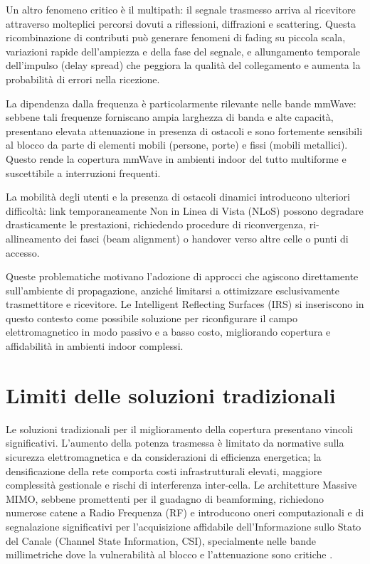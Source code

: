 \documentclass[12pt,a4paper]{report}
\begin{document}
Un altro fenomeno critico è il multipath: il segnale trasmesso arriva
al ricevitore attraverso molteplici percorsi dovuti a riflessioni,
diffrazioni e scattering. Questa ricombinazione di contributi può generare fenomeni di fading su piccola scala, variazioni rapide dell'ampiezza e della fase del segnale, e allungamento temporale dell'impulso (delay spread) che peggiora la qualità del collegamento e aumenta la probabilità di errori nella ricezione.

La dipendenza dalla frequenza è particolarmente rilevante nelle bande
mmWave: sebbene tali frequenze forniscano ampia larghezza di banda e alte capacità, presentano elevata attenuazione in presenza di ostacoli e sono fortemente sensibili al blocco da parte di elementi mobili (persone, porte) e fissi (mobili metallici). Questo rende la copertura mmWave in ambienti indoor del tutto multiforme e suscettibile a interruzioni frequenti.

La mobilità degli utenti e la presenza di ostacoli dinamici
introducono ulteriori difficoltà: link temporaneamente Non in Linea
di Vista (NLoS) possono degradare drasticamente le prestazioni,
richiedendo procedure di riconvergenza, ri-allineamento dei fasci
(beam alignment) o handover verso altre celle o punti di accesso.

Queste problematiche motivano l'adozione di approcci che agiscono
direttamente sull'ambiente di propagazione, anziché limitarsi a
ottimizzare esclusivamente trasmettitore e ricevitore. Le Intelligent
Reflecting Surfaces (IRS) si inseriscono in questo contesto come
possibile soluzione per riconfigurare il campo elettromagnetico in
modo passivo e a basso costo, migliorando copertura e affidabilità in
ambienti indoor complessi.
\cite{itu_p1238_2025}

\section{Limiti delle soluzioni tradizionali}
Le soluzioni tradizionali per il miglioramento della copertura
presentano vincoli significativi. L'aumento della potenza trasmessa è
limitato da normative sulla sicurezza elettromagnetica e da
considerazioni di efficienza energetica; la densificazione della rete
comporta costi infrastrutturali elevati, maggiore complessità
gestionale e rischi di interferenza inter-cella. Le architetture
Massive MIMO, sebbene promettenti per il guadagno di beamforming,
richiedono numerose catene a Radio Frequenza (RF) e introducono oneri
computazionali e di segnalazione significativi per l'acquisizione
affidabile dell'Informazione sullo Stato del Canale (Channel State
Information, CSI), specialmente nelle bande millimetriche dove la
vulnerabilità al blocco e l'attenuazione sono critiche
\cite{3gpp_tr38901,itu_m2410_2017,itu_p1238_2025}.
\end{document}

